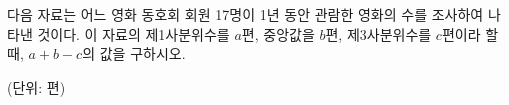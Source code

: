 다음 자료는 어느 영화 동호회 회원 17명이 1년 동안 관람한 영화의 수를 조사하여 나타낸 것이다. 이 자료의 제1사분위수를 $a$편, 중앙값을 $b$편, 제3사분위수를 $c$편이라 할 때, $a+b-c$의 값을 구하시오.\par{\raggedleft\small (단위: 편)\par}
